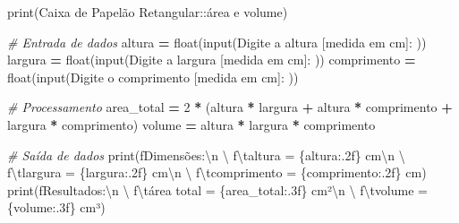 \documentclass[
]{book}
\newenvironment{Shaded}{\begin{snugshade}}{\end{snugshade}}
\newcommand{\BuiltInTok}[1]{#1}
\newcommand{\CharTok}[1]{\textcolor[rgb]{0.31,0.60,0.02}{#1}}
\newcommand{\CommentTok}[1]{\textcolor[rgb]{0.56,0.35,0.01}{\textit{#1}}}
\newcommand{\DecValTok}[1]{\textcolor[rgb]{0.00,0.00,0.81}{#1}}
\newcommand{\NormalTok}[1]{#1}
\newcommand{\OperatorTok}[1]{\textcolor[rgb]{0.81,0.36,0.00}{\textbf{#1}}}
\newcommand{\SpecialCharTok}[1]{\textcolor[rgb]{0.00,0.00,0.00}{#1}}
\newcommand{\SpecialStringTok}[1]{\textcolor[rgb]{0.31,0.60,0.02}{#1}}
\newcommand{\StringTok}[1]{\textcolor[rgb]{0.31,0.60,0.02}{#1}}
\begin{document}
\begin{Shaded}
\begin{Highlighting}[]
\BuiltInTok{print}\NormalTok{(}\StringTok{\textquotesingle{}Caixa de Papelão Retangular::área e volume\textquotesingle{}}\NormalTok{)}

\CommentTok{\# Entrada de dados}
\NormalTok{altura }\OperatorTok{=} \BuiltInTok{float}\NormalTok{(}\BuiltInTok{input}\NormalTok{(}\StringTok{\textquotesingle{}Digite a altura [medida em cm]: \textquotesingle{}}\NormalTok{))}
\NormalTok{largura }\OperatorTok{=} \BuiltInTok{float}\NormalTok{(}\BuiltInTok{input}\NormalTok{(}\StringTok{\textquotesingle{}Digite a largura [medida em cm]: \textquotesingle{}}\NormalTok{))}
\NormalTok{comprimento }\OperatorTok{=} \BuiltInTok{float}\NormalTok{(}\BuiltInTok{input}\NormalTok{(}\StringTok{\textquotesingle{}Digite o comprimento [medida em cm]: \textquotesingle{}}\NormalTok{))}

\CommentTok{\# Processamento}
\NormalTok{area\_total }\OperatorTok{=} \DecValTok{2} \OperatorTok{*}\NormalTok{ (altura }\OperatorTok{*}\NormalTok{ largura }\OperatorTok{+}\NormalTok{ altura }\OperatorTok{*}\NormalTok{ comprimento}
    \OperatorTok{+}\NormalTok{ largura }\OperatorTok{*}\NormalTok{ comprimento)}
\NormalTok{volume }\OperatorTok{=}\NormalTok{ altura }\OperatorTok{*}\NormalTok{ largura }\OperatorTok{*}\NormalTok{ comprimento}

\CommentTok{\# Saída de dados}
\BuiltInTok{print}\NormalTok{(}\SpecialStringTok{f\textquotesingle{}Dimensões:}\CharTok{\textbackslash{}n}\SpecialStringTok{\textquotesingle{}}\NormalTok{ \textbackslash{}}
    \SpecialStringTok{f\textquotesingle{}}\CharTok{\textbackslash{}t}\SpecialStringTok{altura = }\SpecialCharTok{\{}\NormalTok{altura}\SpecialCharTok{:.2f\}}\SpecialStringTok{ cm}\CharTok{\textbackslash{}n}\SpecialStringTok{\textquotesingle{}}\NormalTok{ \textbackslash{}}
    \SpecialStringTok{f\textquotesingle{}}\CharTok{\textbackslash{}t}\SpecialStringTok{largura = }\SpecialCharTok{\{}\NormalTok{largura}\SpecialCharTok{:.2f\}}\SpecialStringTok{ cm}\CharTok{\textbackslash{}n}\SpecialStringTok{\textquotesingle{}}\NormalTok{ \textbackslash{}}
    \SpecialStringTok{f\textquotesingle{}}\CharTok{\textbackslash{}t}\SpecialStringTok{comprimento = }\SpecialCharTok{\{}\NormalTok{comprimento}\SpecialCharTok{:.2f\}}\SpecialStringTok{ cm\textquotesingle{}}\NormalTok{)}
\BuiltInTok{print}\NormalTok{(}\SpecialStringTok{f\textquotesingle{}Resultados:}\CharTok{\textbackslash{}n}\SpecialStringTok{\textquotesingle{}}\NormalTok{ \textbackslash{}}
    \SpecialStringTok{f\textquotesingle{}}\CharTok{\textbackslash{}t}\SpecialStringTok{área total = }\SpecialCharTok{\{}\NormalTok{area\_total}\SpecialCharTok{:.3f\}}\SpecialStringTok{ cm²}\CharTok{\textbackslash{}n}\SpecialStringTok{\textquotesingle{}}\NormalTok{ \textbackslash{}}
    \SpecialStringTok{f\textquotesingle{}}\CharTok{\textbackslash{}t}\SpecialStringTok{volume = }\SpecialCharTok{\{}\NormalTok{volume}\SpecialCharTok{:.3f\}}\SpecialStringTok{ cm³\textquotesingle{}}\NormalTok{)}
\end{Highlighting}
\end{Shaded}
\end{document}
